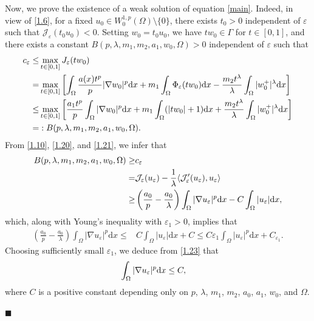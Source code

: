 \documentclass[onecolumn]{autart}
\newenvironment{proof}{{\it Proof: \enspace}}{\hfill $\blacksquare$\par}
\begin{document}
\begin{proof}
	Now, we prove  the existence of a weak solution of equation \eqref{main}. Indeed, in view of \eqref{1.6}, for a fixed $u_0 \in W^{1,p}_0(\Omega) \setminus \{0\}$, there exists $t_0 > 0$ independent of $\varepsilon$ such that $\mathcal{J}_\varepsilon(t_0 u_0) < 0$. Setting $w_0 = t_0 u_0$, we have $t w_0 \in \Gamma$ for  $t \in [0,1]$, and there exists a constant $B (p, \lambda,m_1,m_2,a_1,w_0,\Omega)> 0$ independent of $\varepsilon$ such that
	\begin{align}
		c_\varepsilon \leq &\max_{t \in [0,1]} J_\varepsilon(tw_0)
		\notag\\=
		& \max_{t \in [0,1]} \left[  \int_\Omega \frac{a(x)t^p}{p}|\nabla w_0|^p \mathrm{d}x + m_1\int_\Omega \Phi_\varepsilon(tw_0) \mathrm{d}x -  \frac{m_2t^\lambda}{\lambda}\int_\Omega |w_0^+|^\lambda \mathrm{d}x \right]
		\notag\\\leq
		& \max_{t \in [0,1]} \left[ \frac{a_1t^p}{p}\int_\Omega |\nabla w_0|^p \mathrm{d}x + m_1\int_\Omega (|tw_0| + 1) \mathrm{d}x +\frac{m_2t^\lambda}{\lambda}\int_\Omega |w_0^+|^\lambda \mathrm{d}x  \right]
		\notag\\=
		&: B(p, \lambda,m_1,m_2,a_1,w_0,\Omega).\label{1.21}
	\end{align} 	
	From \eqref{1.10}, \eqref{1.20}, and \eqref{1.21}, we infer that
	\begin{align}
		B(p, \lambda,m_1,m_2,a_1,w_0,\Omega) \geq & c_\varepsilon
		\notag\\=
		&\mathcal{J}_\varepsilon(u_\varepsilon) - \frac{1}{\lambda} \langle \mathcal{J}_\varepsilon'(u_\varepsilon), u_\varepsilon \rangle
		\notag\\\geq
		& \left( \frac{a_0}{p} - \frac{a_0}{\lambda} \right)\int_\Omega |\nabla u_\varepsilon|^p \mathrm{d}x -C\int_\Omega |u_\varepsilon| \mathrm{d}x, \notag
	\end{align} 	
	which, along with  Young's inequality with $\varepsilon_1>0$, implies that
	\begin{align}
		\left( \frac{a_0}{p} - \frac{a_0}{\lambda} \right)\int_\Omega |\nabla u_\varepsilon|^p \mathrm{d}x \leq& C\int_\Omega |u_\varepsilon| \mathrm{d}x + C
		\leq
		C\varepsilon_1\int_\Omega |u_\varepsilon|^p \mathrm{d}x + C_{\varepsilon_1}.\label{1.23}
	\end{align}
	Choosing sufficiently small $\varepsilon_1$, we deduce from \eqref{1.23} that
	\begin{align}
		\int_\Omega |\nabla u_\varepsilon|^p \mathrm{d}x &\leq C,\notag
	\end{align}
	where  $C$ is a positive  constant depending only on $p$, $\lambda$, $m_1$, $m_2$,  $a_0$, $a_1$, $w_0$, and $\Omega$.

\end{proof}
\end{document}
